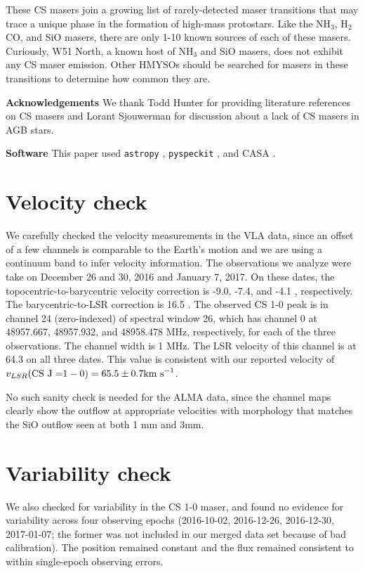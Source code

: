 \documentclass[twocolumn]{aastex62}
\begin{document}
These CS masers join a growing list of rarely-detected maser transitions
that may trace a unique phase in the formation of high-mass protostars.
Like the NH$_3$, H$_2$CO, and SiO masers, there are only 1-10 known sources of
each of these masers.  Curiously, W51 North, a known host of NH$_3$ and SiO masers,
does not exhibit any CS maser emission.  Other HMYSOs should be searched for
masers in these transitions to determine how common they are.

\textbf{Acknowledgements}
We thank Todd Hunter for providing literature references on CS masers and
Lorant Sjouwerman for discussion about a lack of CS masers in AGB stars.

\textbf{Software}
This paper used \texttt{astropy}
\citep{Astropy-Collaboration2013a,Astropy-Collaboration2018a},
\texttt{pyspeckit} \citep{Ginsburg2011c}, and CASA \citep{McMullin2007a}.

\appendix
\section{Velocity check}
We carefully checked the velocity measurements in the VLA data, since an offset
of a few channels is comparable to the Earth's motion and we are using a
continuum band to infer velocity information.  The observations we analyze were
take on December 26 and 30, 2016 and January 7, 2017.  On these dates, the
topocentric-to-barycentric velocity correction is -9.0, -7.4, and -4.1 \kms,
respectively.  The barycentric-to-LSR correction is 16.5 \kms.  The observed CS
1-0 peak is in channel 24 (zero-indexed) of spectral window 26, which has
channel 0 at  48957.667, 48957.932, and 48958.478 MHz, respectively, for each
of the three observations.  The channel width is 1 MHz.  The LSR velocity of
this channel is at 64.3 \kms on all three dates.  This value is consistent with
our reported velocity of $v_{LSR}(\mathrm{CS~J=}1-0) = 65.5 \pm 0.7 \textrm{km~s}^{-1}$.

No such sanity check is needed for the ALMA data, since the channel maps clearly
show the outflow at appropriate velocities with morphology that matches the SiO
outflow seen at both 1 mm and 3mm.

\section{Variability check}
We also checked for variability in the CS 1-0 maser, and found no evidence for variability
across four observing epochs (2016-10-02, 2016-12-26, 2016-12-30, 2017-01-07; the
former was not included in our merged data set because of bad calibration).
The position remained constant and the flux remained consistent to within single-epoch
observing errors.


\end{document}
